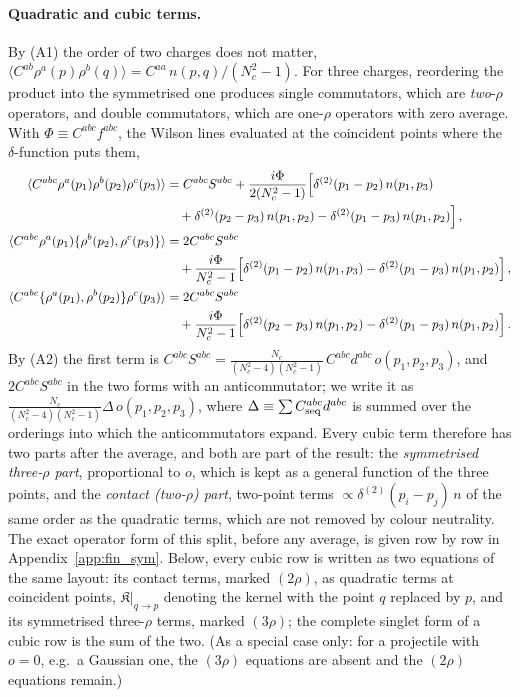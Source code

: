 \paragraph{Quadratic and cubic terms.} By (A1) the order of two charges does not matter, $\langle C^{ab}\rho^a(p)\rho^b(q)\rangle=C^{aa}\,n(p,q)/(N_c^2-1)$. For three charges, reordering the product into the symmetrised one produces single commutators, which are \emph{two}-$\rho$ operators, and double commutators, which are one-$\rho$ operators with zero average. With $\Phi\equiv C^{abc}f^{abc}$, the Wilson lines evaluated at the coincident points where the $\delta$-function puts them,
\begin{align}\label{eq:cubicavg}
\langle C^{abc}\rho^a(p_1)\rho^b(p_2)\rho^c(p_3)\rangle&=C^{abc}S^{abc}+\frac{i\Phi}{2(N_c^2-1)}\Big[\delta^{(2)}(p_1-p_2)\,n(p_1,p_3)\notag\\&\quad+\delta^{(2)}(p_2-p_3)\,n(p_1,p_2)-\delta^{(2)}(p_1-p_3)\,n(p_1,p_2)\Big]\,,\notag\\
\langle C^{abc}\rho^a(p_1)\{\rho^b(p_2),\rho^c(p_3)\}\rangle&=2C^{abc}S^{abc}\notag\\&\quad+\frac{i\Phi}{N_c^2-1}\Big[\delta^{(2)}(p_1-p_2)\,n(p_1,p_3)-\delta^{(2)}(p_1-p_3)\,n(p_1,p_2)\Big]\,,\notag\\
\langle C^{abc}\{\rho^a(p_1),\rho^b(p_2)\}\rho^c(p_3)\rangle&=2C^{abc}S^{abc}\notag\\&\quad+\frac{i\Phi}{N_c^2-1}\Big[\delta^{(2)}(p_2-p_3)\,n(p_1,p_2)-\delta^{(2)}(p_1-p_3)\,n(p_1,p_2)\Big]\,.
\end{align}
By (A2) the first term is $C^{abc}S^{abc}=\frac{N_c}{(N_c^2-4)(N_c^2-1)}\,C^{abc}d^{abc}\,o(p_1,p_2,p_3)$, and $2C^{abc}S^{abc}$ in the two forms with an anticommutator; we write it as $\frac{N_c}{(N_c^2-4)(N_c^2-1)}\Delta\,o(p_1,p_2,p_3)$, where $\Delta\equiv\sum C^{abc}_{\rm seq}d^{abc}$ is summed over the orderings into which the anticommutators expand. Every cubic term therefore has two parts after the average, and both are part of the result: the \emph{symmetrised three-$\rho$ part}, proportional to $o$, which is kept as a general function of the three points, and the \emph{contact (two-$\rho$) part}, two-point terms $\propto\delta^{(2)}(p_i-p_j)\,n$ of the same order as the quadratic terms, which are not removed by colour neutrality. The exact operator form of this split, before any average, is given row by row in Appendix~\ref{app:fin_sym}. Below, every cubic row is written as two equations of the same layout: its contact terms, marked $(2\rho)$, as quadratic terms at coincident points, $\mathfrak K|_{q\to p}$ denoting the kernel with the point $q$ replaced by $p$, and its symmetrised three-$\rho$ terms, marked $(3\rho)$; the complete singlet form of a cubic row is the sum of the two. (As a special case only: for a projectile with $o=0$, e.g.\ a Gaussian one, the $(3\rho)$ equations are absent and the $(2\rho)$ equations remain.)

